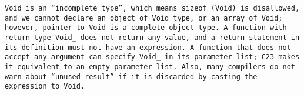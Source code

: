 \tt{Void} is an ``incomplete type'', which means \tt{sizeof (Void)} is
disallowed, and we cannot declare an object of \tt{Void} type, or an array
of \tt{Void}; however, pointer to \tt{Void} is a complete object type.
A function with return type \tt{Void_} does not return any value,
and a return statement in its definition must not have an expression.
A function that does not accept any argument can specify \tt{Void_} in
its parameter list; C23 makes it equivalent to an empty parameter list.
Also, many compilers do not warn about ``unused result'' if
it is discarded by casting the expression to \tt{Void}.

